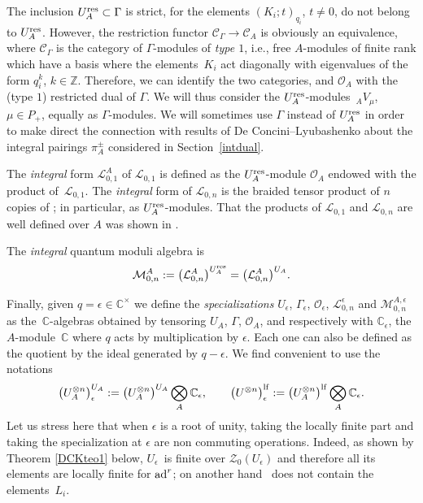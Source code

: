 \documentclass[pdftex]{sigma}
\numberwithin{equation}{section}
\theoremstyle{definition}
\newcommand{\e}{\epsilon}
\newcommand{\mc}{\mathbb{C}}
\newcommand{\mz}{\mathbb{Z}}
\newcommand{\Ll}{{\mathcal L}}
\newcommand{\Mm}{{\mathcal M}}
\newcommand{\Oo}{{\mathcal O}}
\newcommand{\ra}{\rightarrow}
\begin{document}
The inclusion $U_A^{\rm res}\subset \Gamma$ is strict, for the elements $(K_i; t)_{q_i}$, $t\ne 0$, do not belong to $U_A^{\rm res}$. However, the restriction functor $\mathcal{C}_\Gamma \ra\mathcal{C}_A$ is obviously an equivalence, where $\mathcal{C}_\Gamma$ is the category of $\Gamma$-modules of {\it type $1$}, i.e., free $A$-modules of finite rank which have a basis where the elements~$K_i$ act diagonally with eigenvalues of the form $q_i^k$, $k\in \mz$. Therefore, we can identify the two categories, and $\Oo_A$ with the (type $1$) restricted dual of $\Gamma$. We will thus consider the $U_A^{\rm res}$-modules~${}_AV_\mu$, $\mu\in P_+$, equally as $\Gamma$-modules. We will sometimes use $\Gamma$ instead of $U_A^{\rm res}$ in order to make direct the connection with results of De Concini--Lyubashenko about the integral pairings $\pi_A^\pm$ considered in Section~\ref{intdual}.

The {\it integral} form $\Ll_{0,1}^A$ of $\Ll_{0,1}$ is defined as the $U_A^{\rm res}$-module $\Oo_A$ endowed with the product of~$\Ll_{0,1}$. The {\it integral} form \smash{$\Ll_{0,n}^A$} of $\Ll_{0,n}$ is the braided tensor product of $n$ copies of \smash{$\Ll_{0,1}^A$}; in particular, \smash{$\Ll_{0,n}^A = \Oo_A^{\otimes n}$} as $U_A^{\rm res}$-modules. That the products of $\Ll_{0,1}$ and $\Ll_{0,n}$ are well defined over $A$ was shown in \cite[Proposition~6.9]{BR}.

The {\it integral} quantum moduli algebra is
\[\Mm_{0,n}^A := \big(\Ll_{0,n}^A\big)^{U_A^{\rm res}} = \big(\Ll_{0,n}^A\big)^{U_A}.\]

Finally, given $q=\e\in \mc^{\times}$ we define the {\it specializations} $U_\e$, $\Gamma_\e$, $\Oo_\e$, $\Ll_{0,n}^{\e}$ and $\Mm_{0,n}^{A,\e}$ as the~$\mc$-algebras obtained by tensoring $U_A$, $\Gamma$, $\Oo_A$, \smash{$\Ll_{0,n}^A$} and \smash{$\Mm_{0,n}^A$} respectively with $\mc_\e$, the $A$-module~$\mc$ where $q$ acts by multiplication by $\e$. Each one can also be defined as the quotient by the ideal generated by $q-\e$. We find convenient to use the notations
\begin{equation}\label{notambig0}
\big(U_A^{\otimes n}\big)^{U_A}_\e:= \big(U_A^{\otimes n}\big)^{U_A}\bigotimes_A \mc_\e,\qquad \big(U^{\otimes n}\big)^{\rm lf}_\e:= \big(U_A^{\otimes n}\big)^{\rm lf}\bigotimes_A \mc_\e .
\end{equation}
Let us stress here that when $\e$ is a root of unity, taking the locally finite part and taking the specialization at $\e$ are non commuting operations. Indeed, as shown by Theorem \ref{DCKteo1} below, $U_\e$~is finite over $\mathcal{Z}_0(U_\e)$ and therefore all its elements are locally finite for ${\rm ad}^r$; on another hand~\smash{${U_\e^{\rm lf} = U_A^{\rm lf}\bigotimes_A \mc_\e}$} does not contain the elements~$L_i$.
\end{document}

